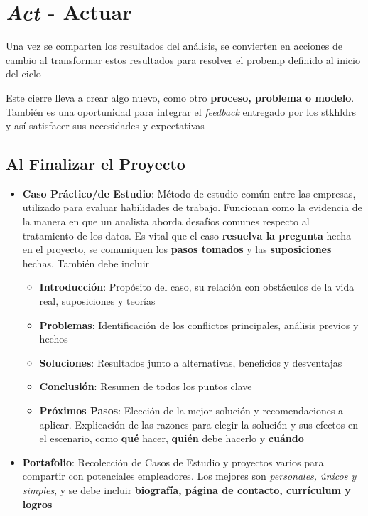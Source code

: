 \section{\textit{Act} - Actuar}
Una vez se comparten los resultados del análisis, se convierten en acciones de cambio al transformar estos resultados para resolver el \gls{probemp} definido al inicio del ciclo

Este cierre lleva a crear algo nuevo, como otro \textbf{proceso, problema o modelo}. También es una oportunidad para integrar el \textit{feedback} entregado por los \gls{stkhldrs} y así satisfacer sus necesidades y expectativas

\subsection{Al Finalizar el Proyecto}
\begin{itemize}
    \item {\textbf{Caso Práctico/de Estudio}: Método de estudio común entre las empresas, utilizado para evaluar habilidades de trabajo. Funcionan como la evidencia de la manera en que un analista aborda desafíos comunes respecto al tratamiento de los datos. Es vital que el caso \textbf{resuelva la pregunta} hecha en el proyecto, se comuniquen los \textbf{pasos tomados} y las \textbf{suposiciones} hechas. También debe incluir
    \begin{itemize}
        \item {\textbf{Introducción}: Propósito del caso, su relación con obstáculos de la vida real, suposiciones y teorías}
        \item {\textbf{Problemas}: Identificación de los conflictos principales, análisis previos y hechos}
        \item {\textbf{Soluciones}: Resultados junto a alternativas, beneficios y desventajas}
        \item {\textbf{Conclusión}: Resumen de todos los puntos clave}
        \item {\textbf{Próximos Pasos}: Elección de la mejor solución y recomendaciones a aplicar. Explicación de las razones para elegir la solución y sus efectos en el escenario, como \textbf{qué} hacer, \textbf{quién} debe hacerlo y \textbf{cuándo}}
    \end{itemize}}
    \item {\textbf{Portafolio}: Recolección de Casos de Estudio y proyectos varios para compartir con potenciales empleadores. Los mejores son \textit{personales, únicos y simples}, y se debe incluir \textbf{biografía, página de contacto, currículum y logros}}
\end{itemize}



\newpage